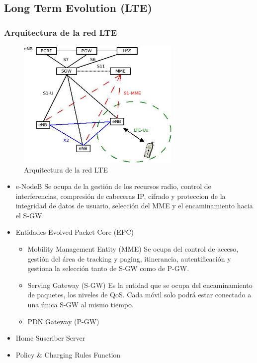\subsection{Long Term Evolution (LTE)}
\label{sub:LTE}
	\subsubsection{Arquitectura de la red LTE}
	\label{ssub:arquiLTE}
		\begin{figure}[htp]
			\centering
			\includegraphics[width=0.7\textwidth]{Imagen/diaLTE.jpg}
			\caption{Arquitectura de la red LTE}
		\end{figure}
		\begin{itemize}
			\item e-NodeB Se ocupa de la gestión de los recursos radio, control de interferencias, compresión de cabeceras IP, cifrado y proteccion de la integridad de datos de usuario, selección del MME y el encaminamiento hacia el S-GW.
			\item Entidades Evolved Packet Core (EPC)
			\begin{itemize}
				\item Mobility Management Entity (MME) Se ocupa del control de acceso, gestión del área de tracking y paging, itinerancia, autentificación y gestiona la selección tanto de S-GW como de P-GW.
				\item Serving Gateway (S-GW) Es la entidad que se ocupa del encaminamiento de paquetes, los niveles de QoS. Cada móvil solo podrá estar conectado a una única S-GW al mismo tiempo.
				\item PDN Gateway (P-GW)
			\end{itemize}
			\item Home Suscriber Server
			\item Policy \& Charging Rules Function
		\end{itemize}
